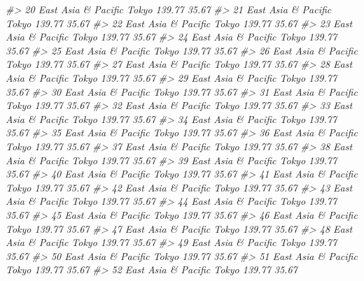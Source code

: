 \documentclass[
  xelatex, ja=standard]{bxjsbook}
\newenvironment{Shaded}{\begin{snugshade}}{\end{snugshade}}
\newcommand{\CommentTok}[1]{\textcolor[rgb]{0.56,0.35,0.01}{\textit{#1}}}
\theoremstyle{definition}
\theoremstyle{definition}
\theoremstyle{definition}
\theoremstyle{definition}
\theoremstyle{remark}
\begin{document}
\begin{Shaded}
\begin{Highlighting}[]
\CommentTok{\#\textgreater{} 20 East Asia \& Pacific   Tokyo    139.77    35.67}
\CommentTok{\#\textgreater{} 21 East Asia \& Pacific   Tokyo    139.77    35.67}
\CommentTok{\#\textgreater{} 22 East Asia \& Pacific   Tokyo    139.77    35.67}
\CommentTok{\#\textgreater{} 23 East Asia \& Pacific   Tokyo    139.77    35.67}
\CommentTok{\#\textgreater{} 24 East Asia \& Pacific   Tokyo    139.77    35.67}
\CommentTok{\#\textgreater{} 25 East Asia \& Pacific   Tokyo    139.77    35.67}
\CommentTok{\#\textgreater{} 26 East Asia \& Pacific   Tokyo    139.77    35.67}
\CommentTok{\#\textgreater{} 27 East Asia \& Pacific   Tokyo    139.77    35.67}
\CommentTok{\#\textgreater{} 28 East Asia \& Pacific   Tokyo    139.77    35.67}
\CommentTok{\#\textgreater{} 29 East Asia \& Pacific   Tokyo    139.77    35.67}
\CommentTok{\#\textgreater{} 30 East Asia \& Pacific   Tokyo    139.77    35.67}
\CommentTok{\#\textgreater{} 31 East Asia \& Pacific   Tokyo    139.77    35.67}
\CommentTok{\#\textgreater{} 32 East Asia \& Pacific   Tokyo    139.77    35.67}
\CommentTok{\#\textgreater{} 33 East Asia \& Pacific   Tokyo    139.77    35.67}
\CommentTok{\#\textgreater{} 34 East Asia \& Pacific   Tokyo    139.77    35.67}
\CommentTok{\#\textgreater{} 35 East Asia \& Pacific   Tokyo    139.77    35.67}
\CommentTok{\#\textgreater{} 36 East Asia \& Pacific   Tokyo    139.77    35.67}
\CommentTok{\#\textgreater{} 37 East Asia \& Pacific   Tokyo    139.77    35.67}
\CommentTok{\#\textgreater{} 38 East Asia \& Pacific   Tokyo    139.77    35.67}
\CommentTok{\#\textgreater{} 39 East Asia \& Pacific   Tokyo    139.77    35.67}
\CommentTok{\#\textgreater{} 40 East Asia \& Pacific   Tokyo    139.77    35.67}
\CommentTok{\#\textgreater{} 41 East Asia \& Pacific   Tokyo    139.77    35.67}
\CommentTok{\#\textgreater{} 42 East Asia \& Pacific   Tokyo    139.77    35.67}
\CommentTok{\#\textgreater{} 43 East Asia \& Pacific   Tokyo    139.77    35.67}
\CommentTok{\#\textgreater{} 44 East Asia \& Pacific   Tokyo    139.77    35.67}
\CommentTok{\#\textgreater{} 45 East Asia \& Pacific   Tokyo    139.77    35.67}
\CommentTok{\#\textgreater{} 46 East Asia \& Pacific   Tokyo    139.77    35.67}
\CommentTok{\#\textgreater{} 47 East Asia \& Pacific   Tokyo    139.77    35.67}
\CommentTok{\#\textgreater{} 48 East Asia \& Pacific   Tokyo    139.77    35.67}
\CommentTok{\#\textgreater{} 49 East Asia \& Pacific   Tokyo    139.77    35.67}
\CommentTok{\#\textgreater{} 50 East Asia \& Pacific   Tokyo    139.77    35.67}
\CommentTok{\#\textgreater{} 51 East Asia \& Pacific   Tokyo    139.77    35.67}
\CommentTok{\#\textgreater{} 52 East Asia \& Pacific   Tokyo    139.77    35.67}

\end{Highlighting}
\end{Shaded}
\end{document}
